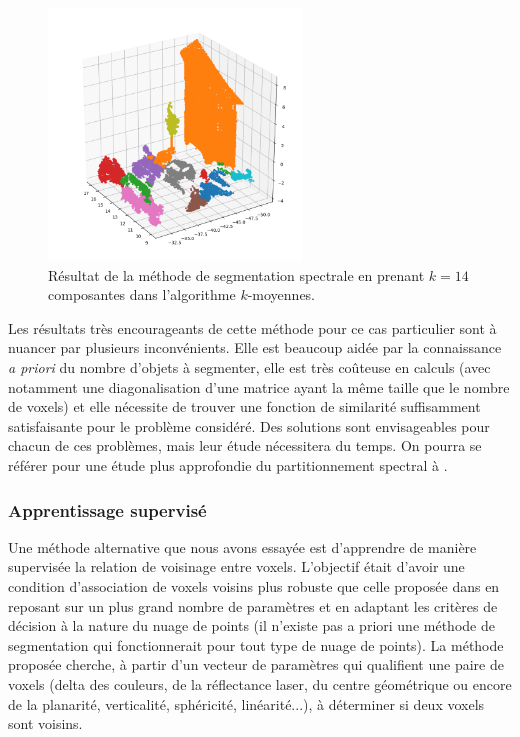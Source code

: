 \documentclass[a4paper, onecolumn, 11pt]{article}
\begin{document}
\begin{figure}[h]
    \centering
    \includegraphics[width=0.6\textwidth]{fig/third_segmentation_spectral.png}
    \caption{Résultat de la méthode de segmentation spectrale en prenant $k = 14$ composantes dans l'algorithme $k$-moyennes.}
    \label{fig:resultat-segmentation-spectrale}
\end{figure}

Les résultats très encourageants de cette méthode pour ce cas particulier sont à nuancer par plusieurs inconvénients. Elle est beaucoup aidée par la connaissance \emph{a priori} du nombre d'objets à segmenter, elle est très coûteuse en calculs (avec notamment une diagonalisation d'une matrice ayant la même taille que le nombre de voxels) et elle nécessite de trouver une fonction de similarité suffisamment satisfaisante pour le problème considéré. Des solutions sont envisageables pour chacun de ces problèmes, mais leur étude nécessitera du temps. On pourra se référer pour une étude plus approfondie du partitionnement spectral à \cite{spectralclustering}.

\subsubsection{Apprentissage supervisé}
Une méthode alternative que nous avons essayée est d'apprendre de manière supervisée la relation de voisinage entre voxels. L'objectif était d'avoir une condition d'association de voxels voisins plus robuste que celle proposée dans \cite{aka_article} en reposant sur un plus grand nombre de paramètres et en adaptant les critères de décision à la nature du nuage de points (il n'existe pas a priori une méthode de segmentation qui fonctionnerait pour tout type de nuage de points). La méthode proposée cherche, à partir d'un vecteur de paramètres qui qualifient une paire de voxels (delta des couleurs, de la réflectance laser, du centre géométrique ou encore de la planarité, verticalité, sphéricité, linéarité...), à déterminer si deux voxels sont voisins. 
\end{document}
